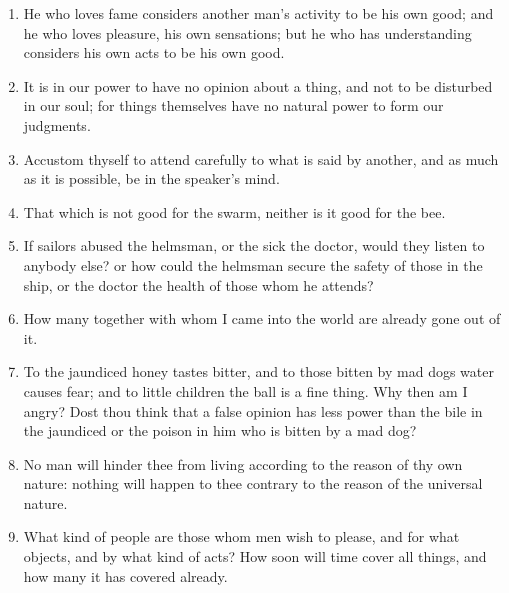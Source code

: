 \begin{enumerate}
\item He who loves fame considers another man's activity to be his own good; and he who loves pleasure, his own sensations; but he who has understanding considers his own acts to be his own good.

\item It is in our power to have no opinion about a thing, and not to be disturbed in our soul; for things themselves have no natural power to form our judgments.

\item Accustom thyself to attend carefully to what is said by another, and as much as it is possible, be in the speaker's mind.

\item That which is not good for the swarm, neither is it good for the bee.

\item If sailors abused the helmsman, or the sick the doctor, would they listen to anybody else? or how could the helmsman secure the safety of those in the ship, or the doctor the health of those whom he attends?

\item How many together with whom I came into the world are already gone out of it.

\item To the jaundiced honey tastes bitter, and to those bitten by mad dogs water causes fear; and to little children the ball is a fine thing. Why then am I angry? Dost thou think that a false opinion has less power than the bile in the jaundiced or the poison in him who is bitten by a mad dog?

\item No man will hinder thee from living according to the reason of thy own nature: nothing will happen to thee contrary to the reason of the universal nature.

\item What kind of people are those whom men wish to please, and for what objects, and by what kind of acts? How soon will time cover all things, and how many it has covered already.
\end{enumerate}
